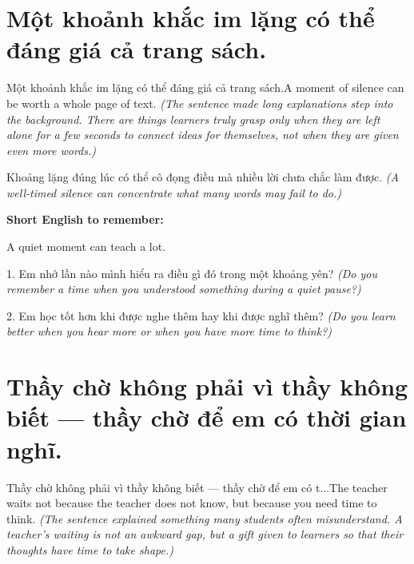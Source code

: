 \section{Một khoảnh khắc im lặng có thể đáng giá cả trang sách.}
\begin{truyen}{Một khoảnh khắc im lặng có thể đáng giá cả trang sách.}{A moment of silence can be worth a whole page of text.}
\textit{(The sentence made long explanations step into the background. There are things learners truly grasp only when they are left alone for a few seconds to connect ideas for themselves, not when they are given even more words.)}
\end{truyen}

\begin{baihoc}
Khoảng lặng đúng lúc có thể cô đọng điều mà nhiều lời chưa chắc làm được.
\textit{(A well-timed silence can concentrate what many words may fail to do.)}
\end{baihoc}

\begin{ghinhoanh}
\textbf{Short English to remember:}

A quiet moment can teach a lot.

\end{ghinhoanh}

\begin{tuhocnhanh}
1. Em nhớ lần nào mình hiểu ra điều gì đó trong một khoảng yên? \textit{(Do you remember a time when you understood something during a quiet pause?)}

2. Em học tốt hơn khi được nghe thêm hay khi được nghĩ thêm? \textit{(Do you learn better when you hear more or when you have more time to think?)}
\end{tuhocnhanh}
\ngancach


\section{Thầy chờ không phải vì thầy không biết — thầy chờ để em có thời gian nghĩ.}
\begin{truyen}{Thầy chờ không phải vì thầy không biết — thầy chờ để em có t...}{The teacher waits not because the teacher does not know, but because you need time to think.}
\textit{(The sentence explained something many students often misunderstand. A teacher's waiting is not an awkward gap, but a gift given to learners so that their thoughts have time to take shape.)}
\end{truyen}

